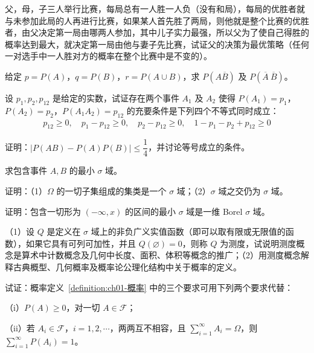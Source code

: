 \documentclass[../../main.tex]{subfiles}
\begin{document}
\begin{exercise}\label{exercise:ch01-42}
父，母，子三人举行比赛，每局总有一人胜一人负（没有和局），每局的优胜者就与未参加此局的人再进行比赛，如果某人首先胜了两局，则他就是整个比赛的优胜者，由父决定第一局由哪两人参加，其中儿子实力最强，所以父为了使自己得胜的概率达到最大，就决定第一局由他与妻子先比赛，试证父的决策为最优策略（任何一对选手中一人胜对方的概率在整个比赛中是不变的）。
\end{exercise}

\begin{exercise}\label{exercise:ch01-43}
给定 $p=P(A)$，$q=P(B)$，$r=P(A\cup B)$，求 $P(A\overline{B})$ 及 $P(\overline{A}\ \overline{B})$。
\end{exercise}

\begin{exercise}\label{exercise:ch01-44}
设 $p_1,p_2,p_{12}$ 是给定的实数，试证存在两个事件 $A_1$ 及 $A_2$ 使得 $P(A_1)=p_1$，$P(A_2)=p_2$，$P(A_1A_2)=p_{12}$ 的充要条件是下列四个不等式同时成立：
\begin{align*}
p_{12}\geqslant 0,\quad p_1-p_{12}\geqslant 0,\quad p_2-p_{12}\geqslant 0,\quad 1-p_1-p_2+p_{12}\geqslant 0
\end{align*}
\end{exercise}

\begin{exercise}\label{exercise:ch01-45}
证明：$\left|P(AB)-P(A)P(B)\right|\leqslant\dfrac{1}{4}$，并讨论等号成立的条件。
\end{exercise}

\begin{exercise}\label{exercise:ch01-46}
求包含事件 $A,B$ 的最小 $\sigma$ 域。
\end{exercise}

\begin{exercise}\label{exercise:ch01-47}
证明：（1）$\Omega$ 的一切子集组成的集类是一个 $\sigma$ 域；（2）$\sigma$ 域之交仍为 $\sigma$ 域。
\end{exercise}

\begin{exercise}\label{exercise:ch01-48}
证明：包含一切形为 $(-\infty,x)$ 的区间的最小 $\sigma$ 域是一维 Borel $\sigma$ 域。
\end{exercise}

\begin{exercise}\label{exercise:ch01-49}
（1）设 $Q$ 是定义在 $\sigma$ 域上的非负广义实值函数（即可以取有限或无限值的函数），如果它具有可列可加性，并且 $Q(\varnothing)=0$，则称 $Q$ 为测度，试说明测度概念是算术中计数概念及几何中长度、面积、体积等概念的推广；（2）用测度概念解释古典概型、几何概率及概率论公理化结构中关于概率的定义。
\end{exercise}

\begin{exercise}\label{exercise:ch01-50}
试证：概率定义~\ref{definition:ch01-概率} 中的三个要求可用下列两个要求代替：

（i）$P(A)\geqslant 0$，对一切 $A\in\mathscr{F}$；

（ii）若 $A_i\in\mathscr{F}$，$i=1,2,\cdots$，两两互不相容，且 $\sum_{i=1}^{\infty}A_i=\Omega$，则 $\sum_{i=1}^{\infty}P(A_i)=1$。
\end{exercise}
\end{document}
